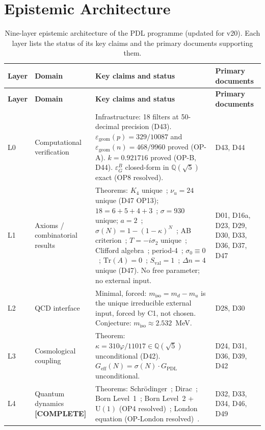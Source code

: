 \documentclass[11pt,a4paper]{article}
\theoremstyle{plain}
\theoremstyle{definition}
\theoremstyle{remark}
\newcommand{\Geff}{G_{\mathrm{eff}}}
\newcommand{\GPDL}{G_{\mathrm{PDL}}}
\newcommand{\sigmaN}{\sigma(N)}
\newcommand{\epsGeomB}{\varepsilon_G^B}
\begin{document}
\section{Epistemic Architecture}
\label{sec:epistemic}

\begin{longtable}{L{0.6cm}L{3.0cm}L{5.5cm}L{4.0cm}}
\caption{Nine-layer epistemic architecture of the PDL programme (updated for v20). Each layer lists the status of its key claims and the primary documents supporting them.}
\label{tab:epistemic}\\
\toprule
\textbf{Layer} & \textbf{Domain} & \textbf{Key claims and status} & \textbf{Primary documents}\\
\midrule
\endfirsthead
\toprule
\textbf{Layer} & \textbf{Domain} & \textbf{Key claims and status} & \textbf{Primary documents}\\
\midrule
\endhead
\bottomrule
\endfoot
L0 & Computational verification & \textcolor{proofblue}{Infrastructure}: 18 filters at 50-decimal precision (D43). $\varepsilon_{\mathrm{geom}}(p)=329/10087$ and $\varepsilon_{\mathrm{geom}}(n)=468/9960$ proved (OP-A). $k=0.921716$ proved (OP-B, D44). $\epsGeomB$ closed-form in $\mathbb{Q}(\sqrt{5})$ exact (OP8 resolved). & D43, D44\\[0.4em]
L1 & Axioms / combinatorial results & \textcolor{proofblue}{Theorems}: $K_4$ unique~\cite{D16a}; $\nu_u=24$ unique (D47 OP13); $18=6+5+4+3$~\cite{D23}; $\sigma=930$ unique; $a=2$~\cite{D30}; $\sigmaN=1-(1-\kappa)^N$~\cite{D24}; AB criterion~\cite{D29}; $T=-i\sigma_2$ unique~\cite{D33}; Clifford algebra~\cite{D33}; period-4~\cite{D33}; $\sigma_0\equiv 0$~\cite{D36}; $\mathrm{Tr}(A)=0$~\cite{D36}; $S_{\mathrm{val}}=1$~\cite{D37}; $\Delta n=4$ unique (D47). No free parameter; no external input. & D01, D16a, D23, D29, D30, D33, D36, D37, D47\\[0.4em]
L2 & QCD interface & Minimal, forced: $m_{\mathrm{iso}}=m_d-m_u$ is the unique irreducible external input, forced by C1, not chosen. \textcolor{conjecturegreen}{Conjecture}: $m_{\mathrm{iso}}\approx 2.532$~MeV. & D28, D30\\[0.4em]
L3 & Cosmological coupling & \textcolor{proofblue}{Theorem}: $\kappa=310\varphi/11017\in\mathbb{Q}(\sqrt{5})$ unconditional (D42). $\Geff(N)=\sigmaN\cdot\GPDL$ unconditional. & D24, D31, D36, D39, D42\\[0.4em]
L4 & Quantum dynamics \textbf{[COMPLETE]} & \textcolor{proofblue}{Theorems}: Schr\"odinger~\cite{D32}; Dirac~\cite{D33}; Born Level~1~\cite{D34}; Born Level~2 + $\mathrm{U}(1)$ (OP4 resolved)~\cite{D46}; London equation (OP-London resolved)~\cite{D49}. & D32, D33, D34, D46, D49\\[0.4em]

\end{longtable}
\end{document}
